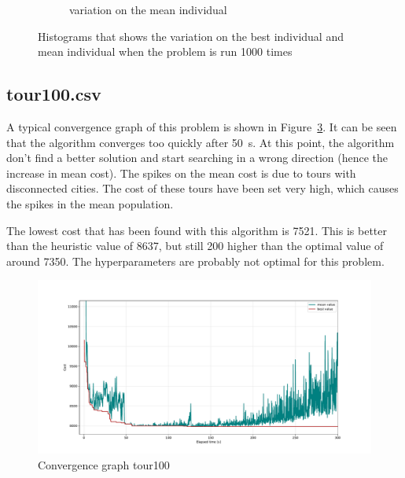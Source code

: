 \documentclass[a4paper,10pt]{article}
\newcommand{\ReplaceMe}[1]{{\color{blue}#1}}
\begin{document}
\begin{figure}[H]
\begin{subfigure}{0.5\linewidth}
      \caption{variation on the mean individual}
      \label{fig:variationmean}
    \end{subfigure}
    \caption{Histograms that shows the variation on the best individual and mean individual when the problem is run 1000 times}
    \label{fig:variations}
  \end{figure}

\subsection{tour100.csv}
A typical convergence graph of this problem is shown in Figure~\ref{fig:convergence100}. It can be seen that the algorithm converges too quickly after \SI{50}{\second}. At this point, the algorithm don't find a better solution and start searching in a wrong direction (hence the increase in mean cost). The spikes on the mean cost is due to tours with disconnected cities. The cost of these tours have been set very high, which causes the spikes in the mean population.

The lowest cost that has been found with this algorithm is 7521. This is better than the heuristic value of 8637, but still 200 higher than the optimal value of around 7350. The hyperparameters are probably not optimal for this problem.
\begin{figure}[H]
  \centering
  \includegraphics[width=.8\linewidth]{img/convergence100.pdf}
  \caption{Convergence graph tour100}
  \label{fig:convergence100}
\end{figure}



\end{document}
